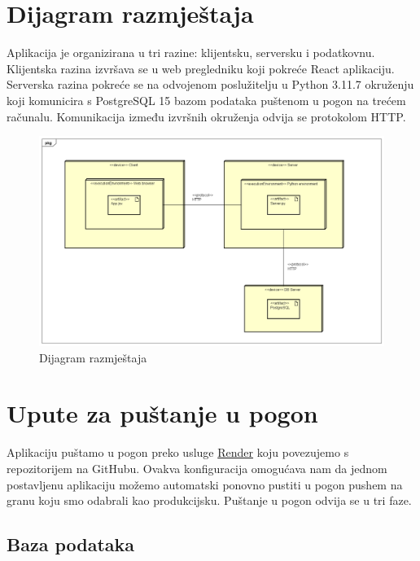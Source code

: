 \clearpage

\eject

		
		\section{Dijagram razmještaja}

        Aplikacija je organizirana u tri razine: klijentsku, serversku i podatkovnu. Klijentska razina izvršava se u web pregledniku koji pokreće React aplikaciju. Serverska razina pokreće se na odvojenom poslužitelju u Python 3.11.7 okruženju koji komunicira s PostgreSQL 15 bazom podataka puštenom u pogon na trećem računalu. Komunikacija između izvršnih okruženja odvija se protokolom HTTP.
			
		\begin{figure}[htp]
			\includegraphics[scale=0.35]{dijagrami/DeploymentDiagram0.png}
			\centering
			\caption{Dijagram razmještaja}
		\end{figure}

        \eject
		
		\section{Upute za puštanje u pogon}

        Aplikaciju puštamo u pogon preko usluge \href{https://render.com/}{Render} koju povezujemo s repozitorijem na GitHubu. Ovakva konfiguracija omogućava nam da jednom postavljenu aplikaciju možemo automatski ponovno pustiti u pogon pushem na granu koju smo odabrali kao produkcijsku. Puštanje u pogon odvija se u tri faze.

        \subsection{Baza podataka}

